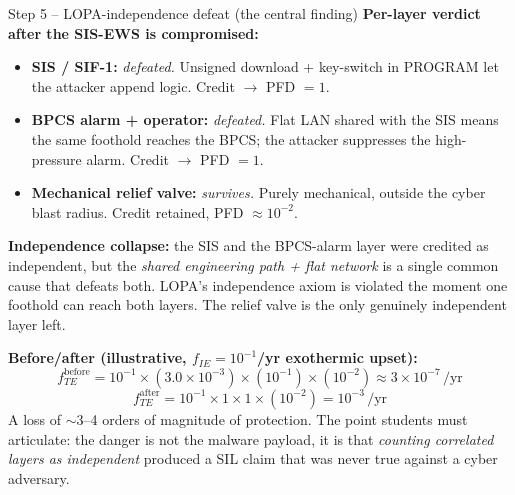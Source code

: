 \documentclass[11pt,a4paper]{article}
\begin{document}
\begin{solutionbox}{Step 5 -- LOPA-independence defeat (the central finding)}
\textbf{Per-layer verdict after the SIS-EWS is compromised:}
\begin{itemize}[leftmargin=*, nosep]
  \item \textbf{SIS / SIF-1:} \emph{defeated.} Unsigned download + key-switch
        in PROGRAM let the attacker append logic. Credit $\to$ PFD $=1$.
  \item \textbf{BPCS alarm + operator:} \emph{defeated.} Flat LAN shared with
        the SIS means the same foothold reaches the BPCS; the attacker
        suppresses the high-pressure alarm. Credit $\to$ PFD $=1$.
  \item \textbf{Mechanical relief valve:} \emph{survives.} Purely mechanical,
        outside the cyber blast radius. Credit retained, PFD $\approx 10^{-2}$.
\end{itemize}

\par\vspace{1mm}
\textbf{Independence collapse:} the SIS and the BPCS-alarm layer were credited
as independent, but the \emph{shared engineering path + flat network} is a
single common cause that defeats both. LOPA's independence axiom is violated
the moment one foothold can reach both layers. The relief valve is the only
genuinely independent layer left.

\par\vspace{1mm}
\textbf{Before/after (illustrative, $f_{IE}=10^{-1}$/yr exothermic upset):}
\[
f_{TE}^{\text{before}} = 10^{-1}\times(3.0\times10^{-3})\times(10^{-1})\times(10^{-2}) \approx 3\times10^{-7}\,/\text{yr}
\]
\[
f_{TE}^{\text{after}} = 10^{-1}\times 1 \times 1 \times (10^{-2}) = 10^{-3}\,/\text{yr}
\]
A loss of $\sim$3--4 orders of magnitude of protection. The point students
must articulate: the danger is not the malware payload, it is that
\emph{counting correlated layers as independent} produced a SIL claim that was
never true against a cyber adversary.
\end{solutionbox}
\end{document}
